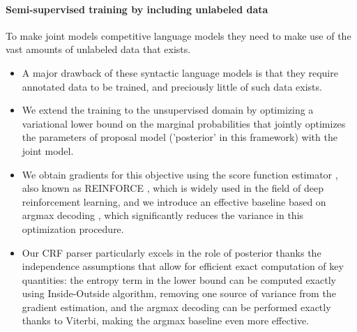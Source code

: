 \paragraph{Semi-supervised training by including unlabeled data} To make joint models competitive language models they need to make use of the vast amounts of unlabeled data that exists.
\begin{itemize}

  \item A major drawback of these syntactic language models is that they require annotated data to be trained, and preciously little of such data exists.

  \item We extend the training to the unsupervised domain by optimizing a variational lower bound on the marginal probabilities that jointly optimizes the parameters of proposal model ('posterior' in this framework) with the joint model.

  \item We obtain gradients for this objective using the score function estimator \citep{fu2006gradient}, also known as REINFORCE \citep{williams1992reinforce}, which is widely used in the field of deep reinforcement learning, and we introduce an effective baseline based on argmax decoding \citep{rennie2017argmax}, which significantly reduces the variance in this optimization procedure.

  \item Our CRF parser particularly excels in the role of posterior thanks the independence assumptions that allow for efficient exact computation of key quantities: the entropy term in the lower bound can be computed exactly using Inside-Outside algorithm, removing one source of variance from the gradient estimation, and the argmax decoding can be performed exactly thanks to Viterbi, making the argmax baseline even more effective.

\end{itemize}


